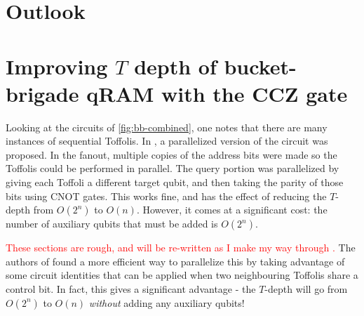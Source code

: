 \documentclass[a4paper,12pt]{article}
\newcommand\todo[1]{\textcolor{red}{#1}}
\begin{document}

\section{Outlook}
\label{sec:outlook}





\appendix


\section{Improving $T$ depth of bucket-brigade qRAM with the CCZ gate}

Looking at the circuits of \autoref{fig:bb-combined}, one notes that there are many instances of sequential Toffolis. 
In \cite{DiMatteo2020}, a parallelized version of the circuit was proposed. 
In the fanout, multiple copies of the address bits were made so the Toffolis could be performed in parallel. 
The query portion was parallelized by giving each Toffoli a different target qubit, and then taking the parity of those bits using CNOT gates. 
This works fine, and has the effect of reducing the $T$-depth from $O(2^n)$ to $O(n)$. 
However, it comes at a significant cost: the number of auxiliary qubits that must be added is $O(2^n)$.

\todo{These sections are rough, and will be re-written as I make my way through \cite{Alexandru2020}.}
The authors of \cite{Alexandru2020} found a more efficient way to parallelize this by taking advantage of some circuit identities that can be applied when two neighbouring Toffolis share a control bit. 
In fact, this gives a significant advantage - the $T$-depth will go from $O(2^n)$ to $O(n)$ \emph{without} adding any auxiliary qubits!
\end{document}
